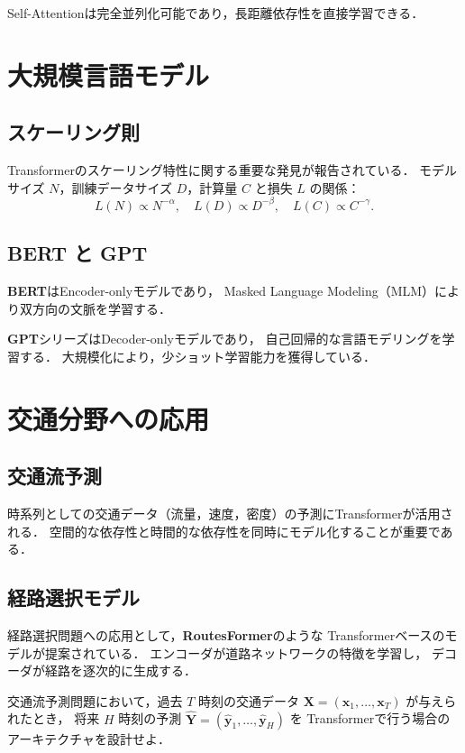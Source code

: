 Self-Attentionは完全並列化可能であり，長距離依存性を直接学習できる．

\section{大規模言語モデル}
\label{sec:llm}

\subsection{スケーリング則}

Transformerのスケーリング特性に関する重要な発見が報告されている\cite{Kaplan2020}．
モデルサイズ $N$，訓練データサイズ $D$，計算量 $C$ と損失 $L$ の関係：
\begin{equation}
  L(N) \propto N^{-\alpha}, \quad L(D) \propto D^{-\beta}, \quad L(C) \propto C^{-\gamma}.
\end{equation}

\subsection{BERT と GPT}

\textbf{BERT}\cite{Devlin2018}はEncoder-onlyモデルであり，
Masked Language Modeling（MLM）により双方向の文脈を学習する．

\textbf{GPT}シリーズはDecoder-onlyモデルであり，
自己回帰的な言語モデリングを学習する．
大規模化により，少ショット学習能力を獲得している．

\section{交通分野への応用}
\label{sec:traffic-application}

\subsection{交通流予測}

時系列としての交通データ（流量，速度，密度）の予測にTransformerが活用される．
空間的な依存性と時間的な依存性を同時にモデル化することが重要である．

\subsection{経路選択モデル}

経路選択問題への応用として，\textbf{RoutesFormer}のような
Transformerベースのモデルが提案されている．
エンコーダが道路ネットワークの特徴を学習し，
デコーダが経路を逐次的に生成する．

\begin{example}
  交通流予測問題において，過去 $T$ 時刻の交通データ
  $\mathbf{X} = (\boldsymbol{x}_1, \ldots, \boldsymbol{x}_T)$ が与えられたとき，
  将来 $H$ 時刻の予測 $\hat{\mathbf{Y}} = (\hat{\boldsymbol{y}}_1, \ldots, \hat{\boldsymbol{y}}_H)$ を
  Transformerで行う場合のアーキテクチャを設計せよ．
\end{example}
